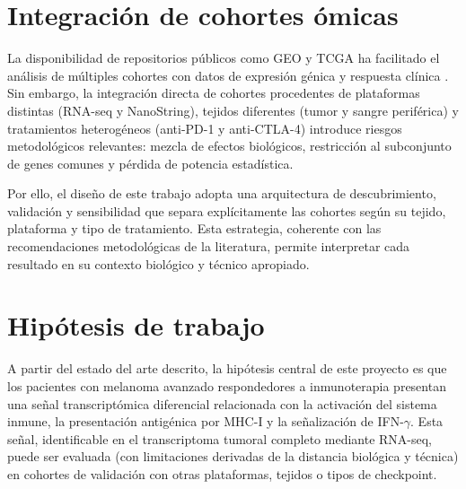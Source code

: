 \section{Integración de cohortes ómicas}

La disponibilidad de repositorios públicos como GEO y TCGA ha facilitado el análisis de múltiples cohortes con datos de expresión génica y respuesta clínica \cite{GEO, DasTCGA2020}. Sin embargo, la integración directa de cohortes procedentes de plataformas distintas (RNA-seq y NanoString), tejidos diferentes (tumor y sangre periférica) y tratamientos heterogéneos (anti-PD-1 y anti-CTLA-4) introduce riesgos metodológicos relevantes: mezcla de efectos biológicos, restricción al subconjunto de genes comunes y pérdida de potencia estadística.

Por ello, el diseño de este trabajo adopta una arquitectura de descubrimiento, validación y sensibilidad que separa explícitamente las cohortes según su tejido, plataforma y tipo de tratamiento. Esta estrategia, coherente con las recomendaciones metodológicas de la literatura, permite interpretar cada resultado en su contexto biológico y técnico apropiado.

\section{Hipótesis de trabajo}

A partir del estado del arte descrito, la hipótesis central de este proyecto es que los pacientes con melanoma avanzado respondedores a inmunoterapia presentan una señal transcriptómica diferencial relacionada con la activación del sistema inmune, la presentación antigénica por MHC-I y la señalización de IFN-$\gamma$. Esta señal, identificable en el transcriptoma tumoral completo mediante RNA-seq, puede ser evaluada (con limitaciones derivadas de la distancia biológica y técnica) en cohortes de validación con otras plataformas, tejidos o tipos de checkpoint.
